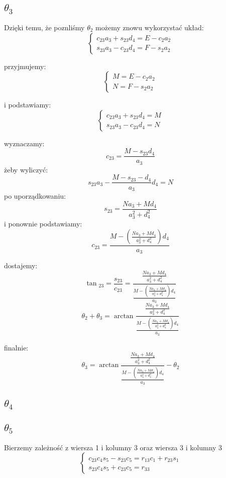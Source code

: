 \documentclass[]{article}
\begin{document}
\subsection{$\theta_3$}
Dzięki temu, że poznliśmy $\theta_2$ możemy znowu wykorzystać układ:
\[ \left\{\begin{array}{c}
c_{23}a_3 + s_{23}d_4 = E - c_2a_2\\
s_{23}a_3 - c_{23}d_4 = F - s_2a_2 
\end{array} \right. \]

przyjmujemy:
\[ \left\{\begin{array}{c}
M = E - c_2a_2\\
N = F - s_2a_2 
\end{array} \right. \]

i podstawiamy:
\[ \left\{\begin{array}{c}
c_{23}a_3 + s_{23}d_4 = M\\
s_{23}a_3 - c_{23}d_4 = N 
\end{array} \right. \]

wyznaczamy:
\[ c_{23} = \frac{M - s_{23}d_4}{a_3}\]
żeby wyliczyć:
\[s_{23}a_3 - \frac{M-s_{23}-d_4}{a_3}d_4 = N\]
po uporządkowaniu:
\[s_{23} = \frac{Na_3 + Md_4}{a_3^2 + d_4^2}\]
i ponownie podstawiamy:
\[c_{23} = \frac{M-(\frac{Na_3 + Md_4}{a_3^2 + d_4^2})d_4}{a_3}\]

dostajemy:
\[ \tan{}_{23}  = \frac{s_{23}}{c_{23}} = \frac{\frac{Na_3 + Md_4}{a_3^2 + d_4^2}}{\frac{M-(\frac{Na_3 + Md_4}{a_3^2 + d_4^2})d_4}{a_3}} \]
\[ \theta_2 + \theta_3 = \arctan{\frac{\frac{Na_3 + Md_4}{a_3^2 + d_4^2}}{\frac{M-(\frac{Na_3 + Md_4}{a_3^2 + d_4^2})d_4}{a_3}}} \]

finalnie:
\[ \theta_3 = \arctan{\frac{\frac{Na_3 + Md_4}{a_3^2 + d_4^2}}{\frac{M-(\frac{Na_3 + Md_4}{a_3^2 + d_4^2})d_4}{a_3}}} - \theta_2 \]

\subsection{$\theta_4$}
\subsection{$\theta_5$}
Bierzemy zależność z wiersza 1 i kolumny 3 oraz wiersza 3 i kolumny 3
\[ \left\{\begin{array}{c}
c_{23}c_4s_5 - s_{23}c_5 = r_{13}c_1 + r_{23}s_1 \\
s_{23}c_4s_5 + c_{23}c_5 = r_{33}
\end{array} \right. \]
\end{document}
